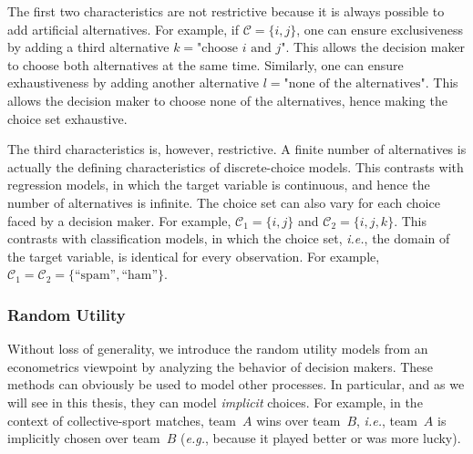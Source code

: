 The first two characteristics are not restrictive because it is always possible to add artificial alternatives.
For example, if $\mathcal{C} = \{i, j\}$, one can ensure exclusiveness by adding a third alternative $k = \text{"choose $i$ and $j$"}$.
This allows the decision maker to choose both alternatives at the same time.
Similarly, one can ensure exhaustiveness by adding another alternative $l = \text{"none of the alternatives"}$.
This allows the decision maker to choose none of the alternatives, hence making the choice set exhaustive.

The third characteristics is, however, restrictive.
A finite number of alternatives is actually the defining characteristics of discrete-choice models.
This contrasts with regression models, in which the target variable is continuous, and hence the number of alternatives is infinite.
The choice set can also vary for each choice faced by a decision maker.
For example, $\mathcal{C}_1 = \{ i, j \}$ and $\mathcal{C}_2 = \{ i, j, k \}$.
This contrasts with classification models, in which the choice set, \textit{i.e.}, the domain of the target variable, is identical for every observation.
For example, $\mathcal{C}_1 = \mathcal{C}_2 = \{ \text{``spam''}, \text{``ham''} \}$.

\subsubsection{Random Utility}

Without loss of generality, we introduce the random utility models from an econometrics viewpoint by analyzing the behavior of decision makers.
These methods can obviously be used to model other processes.
In particular, and as we will see in this thesis, they can model \emph{implicit} choices.
For example, in the context of collective-sport matches, team~$A$ wins over team~$B$, \textit{i.e.}, team~$A$ is implicitly chosen over team~$B$ (\textit{e.g.}, because it played better or was more lucky).

